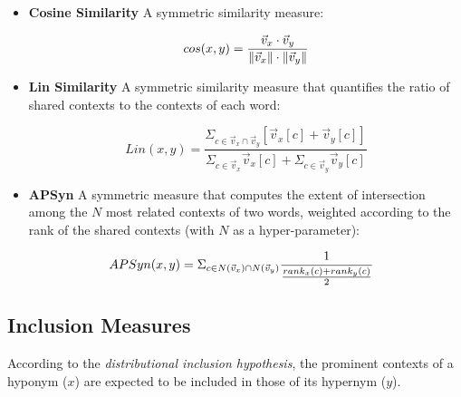\documentclass[11pt]{article}
\begin{document}
\begin{itemize}[leftmargin=*]

	\item \textbf{Cosine Similarity} \cite{salton1986introduction} A symmetric similarity measure:
	
	\begin{equation*}
	cos(x,y) = \frac{\vec{v}_x \cdot \vec{v}_y}{\left\lVert \vec{v}_x \right\rVert \cdot \left\lVert \vec{v}_y \right\rVert}
	\end{equation*}
	
	\item \textbf{Lin Similarity} \cite{lin1998information} A symmetric similarity measure that quantifies the ratio of shared contexts to the contexts of each word:
	
	\begin{equation*}
	Lin(x,y)= \frac{\Sigma_{c \in \vec{v}_x \cap \vec{v}_y}{[\vec{v}_x[c] + \vec{v}_y[c]]}}{\Sigma_{c \in \vec{v}_x }{\vec{v}_x[c]} + \Sigma_{c \in \vec{v}_y}{\vec{v}_y[c]}}
	\end{equation*}
	
	\item \textbf{APSyn} \cite{santus2016unsupervised} A symmetric measure that computes the extent of intersection among the $N$ most related contexts of two words, weighted according to the rank of the shared contexts (with $N$ as a hyper-parameter):

	\begin{equation*}
	\hspace*{-7pt}
	APSyn(x, y) = \Sigma_{c \in N(\vec{v}_x) \cap N(\vec{v}_y)}{\frac{1}{\frac{rank_x(c) + rank_y(c)}{2}}}
	\end{equation*}
	
\end{itemize}

\subsection{Inclusion Measures}
\label{sec:inclusion_measures}

According to the \emph{distributional inclusion hypothesis}, the prominent contexts of a hyponym ($x$) are expected to be included in those of its hypernym ($y$). 
\end{document}
